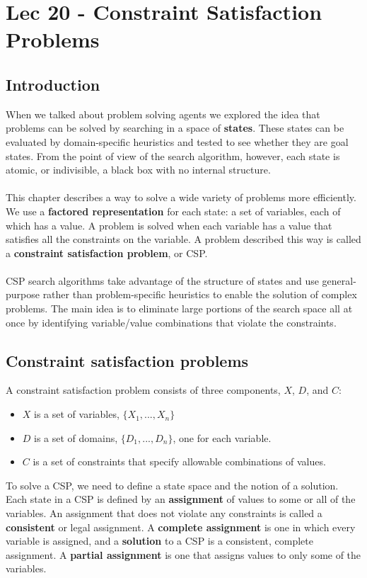 \chapter{Lec 20 - Constraint Satisfaction Problems}
\section{Introduction}
When we talked about problem solving agents we explored the idea that problems can be solved by searching in a space of \textbf{states}. These states can be evaluated by domain-specific heuristics and tested to see whether they are goal states. From the point of view of the search algorithm, however, each state is
atomic, or indivisible, a black box with no internal structure.\\\\
This chapter describes a way to solve a wide variety of problems more efficiently. We use a \textbf{factored representation} for each state:  a set of variables, each of which has a value. A problem is solved when each variable has a value that satisfies all the constraints on the variable. A problem described this way is called a \textbf{constraint satisfaction problem}, or CSP.\\\\
CSP search algorithms take advantage of the structure of states and use general-purpose rather than problem-specific heuristics to enable the solution of complex problems. The main idea is to eliminate large portions of the search space all at once by identifying variable/value combinations that violate the constraints.

\section{Constraint satisfaction problems}
A constraint satisfaction problem consists of three components, $X$, $D$, and $C$:
\begin{itemize}
    \item $X$ is a set of variables, $\{X_1, ..., X_n\}$
    \item $D$ is a set of domains, $\{D_1, ..., D_n\}$, one for each variable.
    \item $C$ is a set of constraints that specify allowable combinations of values.
\end{itemize}
To solve a CSP, we need to define a state space and the notion of a solution. Each
state in a CSP is defined by an \textbf{assignment} of values to some or all of the variables. An assignment that does not violate any constraints is called a \textbf{consistent} or legal assignment. A \textbf{complete assignment} is one in which every variable is assigned, and a \textbf{solution} to a CSP is a consistent, complete assignment. A \textbf{partial assignment} is one that assigns values to only some of the variables.

